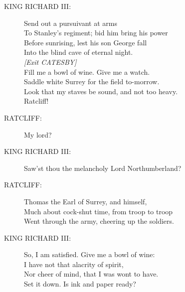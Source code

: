 \documentclass{article}
\begin{document}
\begin{description}
\item[KING RICHARD III:] 
\hspace{1pt}Send out a pursuivant at arms\\
\hspace{1pt}To Stanley's regiment; bid him bring his power\\
\hspace{1pt}Before sunrising, lest his son George fall\\
\hspace{1pt}Into the blind cave of eternal night.\\
{\it [Exit CATESBY]}\\
\hspace{1pt}Fill me a bowl of wine. Give me a watch.\\
\hspace{1pt}Saddle white Surrey for the field to-morrow.\\
\hspace{1pt}Look that my staves be sound, and not too heavy.\\
\hspace{1pt}Ratcliff!\\
\end{description}
\begin{description}
\item[RATCLIFF:] 
\hspace{1pt}My lord?\\
\end{description}
\begin{description}
\item[KING RICHARD III:] 
\hspace{1pt}Saw'st thou the melancholy Lord Northumberland?\\
\end{description}
\begin{description}
\item[RATCLIFF:] 
\hspace{1pt}Thomas the Earl of Surrey, and himself,\\
\hspace{1pt}Much about cock-shut time, from troop to troop\\
\hspace{1pt}Went through the army, cheering up the soldiers.\\
\end{description}
\begin{description}
\item[KING RICHARD III:] 
\hspace{1pt}So, I am satisfied. Give me a bowl of wine:\\
\hspace{1pt}I have not that alacrity of spirit,\\
\hspace{1pt}Nor cheer of mind, that I was wont to have.\\
\hspace{1pt}Set it down. Is ink and paper ready?\\
\end{description}
\end{document}
